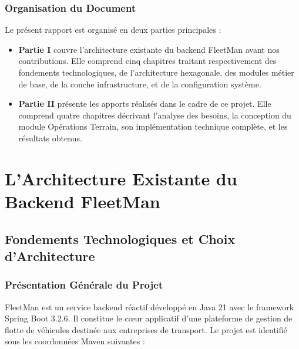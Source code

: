 \documentclass[12pt,a4paper]{report}
\begin{document}
\section*{Organisation du Document}

Le présent rapport est organisé en deux parties principales :

\begin{itemize}[leftmargin=2cm]
  \item \textbf{Partie I} couvre l'architecture existante du backend FleetMan avant nos contributions. Elle comprend cinq chapitres traitant respectivement des fondements technologiques, de l'architecture hexagonale, des modules métier de base, de la couche infrastructure, et de la configuration système.

  \item \textbf{Partie II} présente les apports réalisés dans le cadre de ce projet. Elle comprend quatre chapitres décrivant l'analyse des besoins, la conception du module Opérations Terrain, son implémentation technique complète, et les résultats obtenus.
\end{itemize}

\part{L'Architecture Existante du Backend FleetMan}

\chapter{Fondements Technologiques et Choix d'Architecture}

\section{Présentation Générale du Projet}

FleetMan est un service backend réactif développé en Java 21 avec le framework Spring Boot 3.2.6. Il constitue le cœur applicatif d'une plateforme de gestion de flotte de véhicules destinée aux entreprises de transport. Le projet est identifié sous les coordonnées Maven suivantes :
\end{document}
